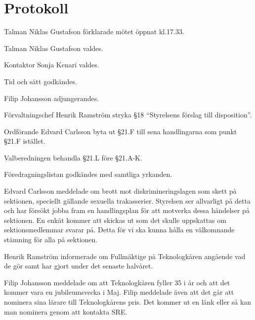 \documentclass[10pt]{article}
\def\mo{Niklas Gustafson}
\def\ms{Sonja Kenari}
\begin{document}
\section*{Protokoll}
\begin{paragrafer}
Talman {\mo} förklarade mötet öppnat kl.17.33.

Talman {\mo} valdes.

Kontaktor {\ms} valdes.

Tid och sätt godkändes.

\valavj

Filip Johansson adjungerandes.



Förvaltningschef Henrik Ramström \ypa stryka \S18 ``Styrelsens förslag till disposition''.

Ordförande Edvard Carlsson \ypa byta ut \S21.F till sena handlingarna
 som punkt \S21.F istället.

Valberedningen \ypa behandla \S21.L före \S21.A-K.

Föredragningslistan godkändes med samtliga yrkanden.


Edvard Carlsson meddelade om brott mot diskrimineringslagen som skett på sektionen, speciellt gällande sexuella trakasserier.
Styrelsen ser allvarligt på detta och har försökt jobba fram en handlingsplan för att motverka dessa händelser på sektionen.
En enkät kommer att skickas ut som det skulle uppskattas om sektionsmedlemmar svarar på. Detta för vi ska kunna hålla en välkomnande stämning för alla på sektionen.

Henrik Ramström informerade om Fullmäktige på Teknologkåren angående vad de gör samt har gjort under det senaste halvåret.

Filip Johansson meddelade om att Teknologkåren fyller 35 i år och att det kommer vara en jubileumsvecka i Maj. Filip meddelade även att 
det går att nominera sina lärare till Teknologkårens pris. Det kommer ut en länk eller så kan man nominera genom att kontakta SRE. 


\end{paragrafer}
\end{document}
